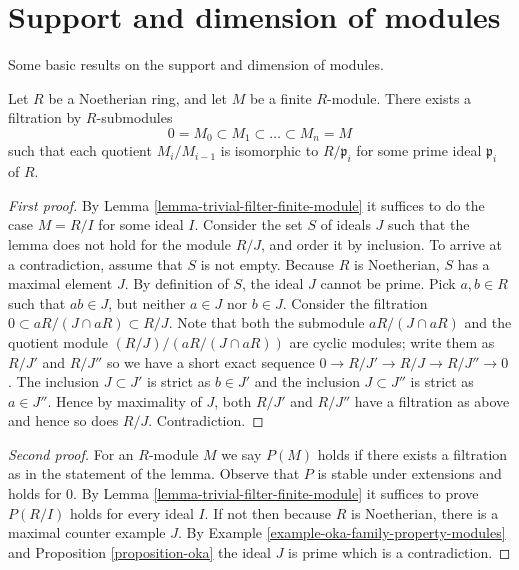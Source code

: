 \section{Support and dimension of modules}
\label{section-support}

\noindent
Some basic results on the support and dimension of modules.

\begin{lemma}
\label{lemma-filter-Noetherian-module}
Let $R$ be a Noetherian ring, and let $M$ be a finite $R$-module.
There exists a filtration by $R$-submodules
$$
0 = M_0 \subset M_1 \subset \ldots \subset M_n = M
$$
such that each quotient $M_i/M_{i-1}$ is isomorphic
to $R/\mathfrak p_i$ for some prime ideal $\mathfrak p_i$
of $R$.
\end{lemma}

\begin{proof}[First proof]
By Lemma \ref{lemma-trivial-filter-finite-module}
it suffices to do the case $M = R/I$ for some ideal $I$.
Consider the set $S$ of ideals $J$ such that the lemma
does not hold for the module $R/J$, and order it by
inclusion. To arrive at a
contradiction, assume that $S$ is not empty. Because
$R$ is Noetherian, $S$ has a maximal element $J$.
By definition of $S$, the ideal $J$ cannot be prime.
Pick $a, b\in R$ such that $ab \in J$, but neither
$a \in J$ nor $b\in J$. Consider the filtration
$0 \subset aR/(J \cap aR) \subset R/J$.
Note that both the submodule $aR/(J \cap aR)$ and the quotient
module $(R/J)/(aR/(J \cap aR))$ are cyclic modules; write
them as $R/J'$ and $R/J''$ so we have a short exact sequence
$0 \to R/J' \to R/J \to R/J'' \to 0$.
The inclusion $J \subset J'$ is strict
as $b \in J'$ and the inclusion $J \subset J''$ is strict as $a \in J''$.
Hence by maximality of $J$, both $R/J'$ and $R/J''$ have a filtration as
above and hence so does $R/J$. Contradiction.
\end{proof}

\begin{proof}[Second proof]
For an $R$-module $M$ we say $P(M)$ holds if there exists a filtration
as in the statement of the lemma. Observe that $P$ is stable under
extensions and holds for $0$. By Lemma \ref{lemma-trivial-filter-finite-module}
it suffices to prove $P(R/I)$ holds for every ideal $I$.
If not then because $R$ is Noetherian, there is a maximal
counter example $J$. By Example \ref{example-oka-family-property-modules} and
Proposition \ref{proposition-oka}
the ideal $J$ is prime which is a contradiction.
\end{proof}

